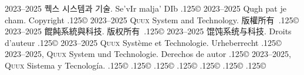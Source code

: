 \documentclass{cookbook}
\begin{document}
{{{	2023--2025 퀙스 시스템과 기술.
Se'vIr malja' DIb {\lower.125\baselineskip\hbox{\copyright}} %
	2023--2025 Qugh pat je cham.
\texttt{{\gitabbrcommithash}}
Copyright {\lower.125\baselineskip\hbox{\copyright}}
	2023--2025 \textsc{Quux} System and Technology.
版權所有~{\lower.125\baselineskip\hbox{\copyright}}
	2023--2025 餛飩系統與科技.
版权所有~{\lower.125\baselineskip\hbox{\copyright}}
	2023--2025 馄饨系统与科技.
Droits d'auteur {\lower.125\baselineskip\hbox{\copyright}} %
	2023--2025 \textsc{Quux} Système et Technologie.
Urheberrecht {\lower.125\baselineskip\hbox{\copyright}} %
	2023--2025, \textsc{Quux} System und Technologie.
Derechos de autor {\lower.125\baselineskip\hbox{\copyright}} %
	2023--2025, \textsc{Quux} Sistema y Tecnología.
{\lower.125\baselineskip\hbox{\copyright}}
{\lower.125\baselineskip\hbox{\copyright}}
\texttt{{\gitabbrcommithash}}
\hspace{.25em plus 1em}%
{\lower.125\baselineskip\hbox{\copyright}}
{\lower.125\baselineskip\hbox{\copyright}}
{\lower.125\baselineskip\hbox{\copyright}}
{\lower.125\baselineskip\hbox{\copyright}}
{\lower.125\baselineskip\hbox{\copyright}}
\vspace{-.5\textheight}%
}}}%
\end{document}
